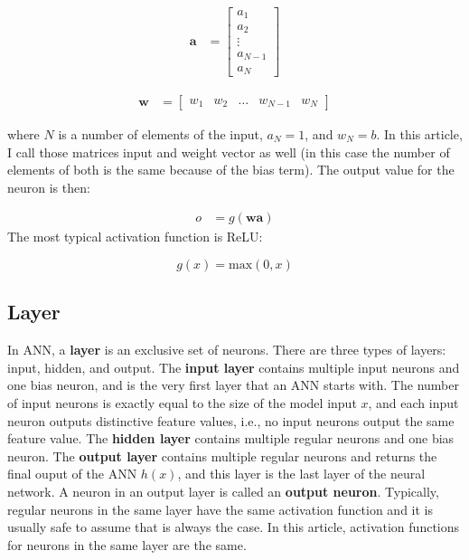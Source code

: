 \documentclass[letterpaper, 11pt]{article}
\numberwithin{equation}{section}
\numberwithin{figure}{section}
\numberwithin{table}{section}
\begin{document}
\noindent\begin{minipage}{.5\linewidth}
\begin{align}
	\textbf{a}	&= 	\begin{bmatrix}
				a_{1}\\
				a_{2}\\
				\vdots\\
				a_{N-1}\\
				a_{N}
				\end{bmatrix}
\end{align}
\end{minipage}
\begin{minipage}{.5\linewidth}
\begin{align}
	\textbf{w}	&= 	\begin{bmatrix}
				w_{1} & w_{2} & \hdots & w_{N-1} & w_{N}
				\end{bmatrix}
\end{align}
\end{minipage}
\break

where \(N\) is a number of elements of the input, \(a_{N} = 1\), and \(w_{N} = b\). In this article, I call those matrices input and weight vector as well (in this case the number of elements of both is the same because of the bias term). The output value for the neuron is then:

\begin{align}
	o &= g(\textbf{w}\textbf{a})
\end{align}
The most typical activation function is ReLU:

\begin{equation}
	g(x) = \text{max}(0, x)
\end{equation}

\subsection{Layer}
In ANN, a \textbf{layer} is an exclusive set of neurons. There are three types of layers: input, hidden, and output. The \textbf{input layer} contains multiple input neurons and one bias neuron, and is the very first layer that an ANN starts with. The number of input neurons is exactly equal to the size of the model input \(x\), and each input neuron outputs distinctive feature values, i.e., no input neurons output the same feature value. The \textbf{hidden layer} contains multiple regular neurons and one bias neuron. The \textbf{output layer} contains multiple regular neurons and returns the final ouput of the ANN \(h(x)\), and this layer is the last layer of the neural network. A neuron in an output layer is called an \textbf{output neuron}. Typically, regular neurons in the same layer have the same activation function and it is usually safe to assume that is always the case. In this article, activation functions for neurons in the same layer are the same. 
\end{document}
